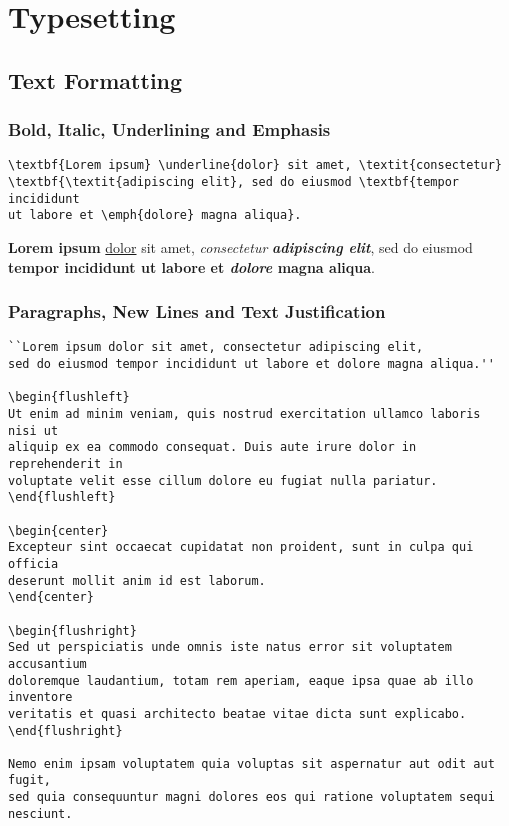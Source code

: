 \chapter*{Typesetting}
\label{ch:typesetting}

\section*{Text Formatting}
\label{sec:text-formatting}

\subsection*{Bold, Italic, Underlining and Emphasis}
\label{subsec:bold-italic-underlining-and-emphasis}

\begin{lstlisting}[caption={Bold, italic, underlining and emphasis.}]
\textbf{Lorem ipsum} \underline{dolor} sit amet, \textit{consectetur}
\textbf{\textit{adipiscing elit}, sed do eiusmod \textbf{tempor incididunt
ut labore et \emph{dolore} magna aliqua}.
\end{lstlisting}

\textbf{Lorem ipsum} \underline{dolor} sit amet, \textit{consectetur}
\textbf{\textit{adipiscing elit}}, sed do eiusmod \textbf{tempor incididunt
ut labore et \emph{dolore} magna aliqua}.

\subsection*{Paragraphs, New Lines and Text Justification}
\label{subsec:paragraphs-new-lines-and-text-justification}

\begin{lstlisting}[caption={Paragraphs, new lines and text justification.}]
``Lorem ipsum dolor sit amet, consectetur adipiscing elit,
sed do eiusmod tempor incididunt ut labore et dolore magna aliqua.''

\begin{flushleft}
Ut enim ad minim veniam, quis nostrud exercitation ullamco laboris nisi ut
aliquip ex ea commodo consequat. Duis aute irure dolor in reprehenderit in
voluptate velit esse cillum dolore eu fugiat nulla pariatur.
\end{flushleft}

\begin{center}
Excepteur sint occaecat cupidatat non proident, sunt in culpa qui officia
deserunt mollit anim id est laborum.
\end{center}

\begin{flushright}
Sed ut perspiciatis unde omnis iste natus error sit voluptatem accusantium
doloremque laudantium, totam rem aperiam, eaque ipsa quae ab illo inventore
veritatis et quasi architecto beatae vitae dicta sunt explicabo.
\end{flushright}

Nemo enim ipsam voluptatem quia voluptas sit aspernatur aut odit aut fugit,
sed quia consequuntur magni dolores eos qui ratione voluptatem sequi nesciunt.
\end{lstlisting}

